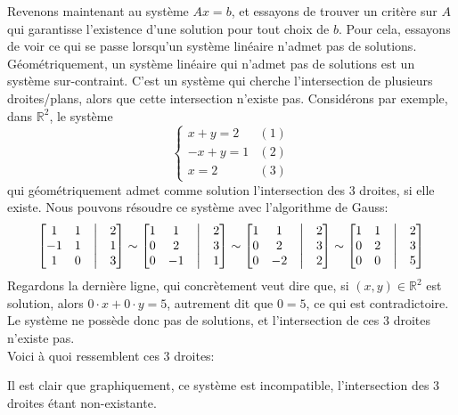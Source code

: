 \documentclass{article}
\newcommand{\R}{\mathbb{R}}
\begin{document}
\noindent Revenons maintenant au système $Ax=b$, et essayons de trouver un critère sur $A$ qui garantisse l'existence d'une solution pour tout choix de $b$. Pour cela, essayons de voir ce qui se passe lorsqu'un système linéaire n'admet pas de solutions. \\
Géométriquement, un système linéaire qui n'admet pas de solutions est un système sur-contraint. C'est un système qui cherche l'intersection de plusieurs droites/plans, alors que cette intersection n'existe pas. Considérons par exemple, dans $\R^2$, le système 
$$\begin{cases} 
x+y=2 & (1)\\
-x+y=1 & (2)\\
x=2 & (3)
\end{cases}$$
qui géométriquement admet comme solution l'intersection des 3 droites, si elle existe. Nous pouvons résoudre ce système avec l'algorithme de Gauss:
$$\begin{bmatrix}
1 & 1 & \bigm| & 2 \\
-1 & 1 & \bigm| & 1 \\
1 & 0 & \bigm| & 3 \\
\end{bmatrix} \sim 
\begin{bmatrix}
1 & 1 & \bigm| & 2 \\
0 & 2 & \bigm| & 3 \\
0 & -1 & \bigm| & 1 \\
\end{bmatrix} \sim 
\begin{bmatrix}
1 & 1 & \bigm| & 2 \\
0 & 2 & \bigm| & 3 \\
0 & -2 & \bigm| & 2 \\
\end{bmatrix} \sim 
\begin{bmatrix}
1 & 1 & \bigm| & 2 \\
0 & 2 & \bigm| & 3 \\
0 & 0 & \bigm| & 5 \\
\end{bmatrix}$$
Regardons la dernière ligne, qui concrètement veut dire que, si $(x,y) \in \R^2$ est solution, alors $0\cdot x + 0\cdot y = 5$, autrement dit que $0=5$, ce qui est contradictoire. Le système ne possède donc pas de solutions, et l'intersection de ces 3 droites n'existe pas. \\
Voici à quoi ressemblent ces 3 droites:
\begin{center}
\end{center}
Il est clair que graphiquement, ce système est incompatible, l'intersection des 3 droites étant non-existante. \\
\end{document}
